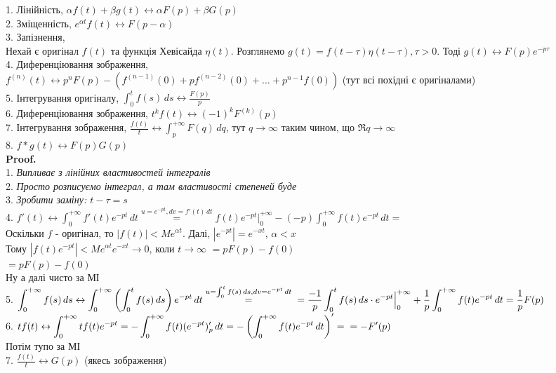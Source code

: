 \documentclass[a4paper, 10pt]{article}
\def\hugespace{\vspace{5mm} \\}
\theoremstyle{theoremdd}
\theoremstyle{theoremdd}
\theoremstyle{theoremdd}
\theoremstyle{theoremdd}
\theoremstyle{theoremdd}
\theoremstyle{theoremdd}
\theoremstyle{theoremdd}
\theoremstyle{theoremdd}
\begin{document}
1. Лінійність, $\alpha f(t) + \beta g(t) \leftrightarrow \alpha F(p) + \beta G(p)$
\hugespace
2. Зміщенність, $e^{\alpha t}f(t) \leftrightarrow F(p-\alpha)$
\hugespace
3. Запізнення,\\
Нехай є оригінал $f(t)$ та функція Хевісайда $\eta(t)$. Розглянемо $g(t) = f(t-\tau) \eta(t-\tau), \tau>0$. Тоді $g(t) \leftrightarrow F(p)e^{-p\tau}$
\hugespace
4. Диференціювання зображення,\\ $f^{(n)}(t) \leftrightarrow p^n F(p) - (f^{(n-1)}(0)+ pf^{(n-2)}(0)+\dots + p^{n-1}f(0))$ (тут всі похідні є оригіналами)
\hugespace
5. Інтегрування оригіналу, $\displaystyle \int_0^t f(s)\,ds \leftrightarrow \frac{F(p)}{p}$
\hugespace
6. Диференціювання зображення, $t^k f(t) \leftrightarrow (-1)^k F^{(k)}(p)$
\hugespace
7. Інтегрування зображення, $\displaystyle \frac{f(t)}{t} \leftrightarrow \int_p^{+\infty} F(q)\,dq$, тут $q \to \infty$ таким чином, що $\Re q \to \infty$
\hugespace
8. $f*g(t) \leftrightarrow F(p) G(p)$\\
\textbf{Proof.}\\
1. \textit{Випливає з лінійних властивостей інтегралів}
\hugespace
2. \textit{Просто розписуємо інтеграл, а там властивості степеней буде}
\hugespace
3. \textit{Зробити заміну: $t - \tau = s$}
\hugespace
4. $f'(t) \leftrightarrow \displaystyle \int_0^{+\infty} f'(t)e^{-pt}\,dt \overset{u=e^{-pt}, dv=f'(t)\,dt}{=} f(t)e^{-pt}\Big|_0^{+\infty} - (-p) \int_0^{+\infty} f(t)e^{-pt}\,dt = $\\
Оскільки $f$ -  оригінал, то $|f(t)| < Me^{\alpha t}$. Далі, $|e^{-pt}| = e^{-xt}$, $\alpha < x$\\
Тому $|f(t)e^{-pt}| < Me^{\alpha t}e^{-xt} \to 0$, коли $t \to \infty$
$= pF(p) - f(0)$\\
$=pF(p)-f(0)$\\
Ну а далі чисто за МІ
\hugespace
5. $\displaystyle \int_0^{+\infty} f(s)\,ds \leftrightarrow \int_0^{+\infty} \left( \int_0^t f(s)\,ds \right) e^{-pt}\,dt \overset{\scriptstyle u = \int_0^t f(s)\,ds, dv = e^{-pt}\,dt}{=} \\ = \frac{-1}{p} \int_0^t f(s)\,ds \cdot e^{-pt} \Big|_0^{+\infty} + \frac{1}{p} \int_0^{+\infty} f(t)e^{-pt}\,dt = \frac{1}{p}F(p)$
\hugespace
6. $t f(t) \leftrightarrow \displaystyle \int_0^{+\infty} tf(t)e^{-pt} = -\int_0^{+\infty} f(t) (e^{-pt})'_p\,dt = - \left(\int_0^{+\infty} f(t)e^{-pt}\,dt \right)' = \\ = -F'(p)$\\
Потім тупо за МІ
\hugespace
7. $\displaystyle \frac{f(t)}{t} \leftrightarrow G(p)$ (якесь зображення)\\
\end{document}
